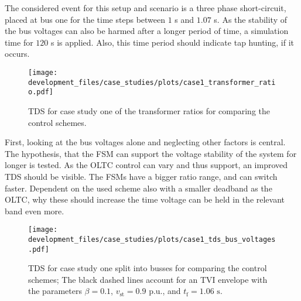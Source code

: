 The considered event for this setup and scenario is a three phase short-circuit, placed at bus one for the time steps between $1$ s and $1.07$ s.
As the stability of the bus voltages can also be harmed after a longer period of time, a simulation time for $120$ s is applied.
Also, this time period should indicate tap hunting, if it occurs.

\begin{figure}[htbp!]
    \centering
    \texttt{[image: development\_files/case\_studies/plots/case1\_transformer\_ratio.pdf]}
    \caption[\acs{TDS} for case study one of the transformer ratios for comparing the control schemes]{\acs{TDS} for case study one of the transformer ratios for comparing the control schemes.}
    \label{fig:case1-trans-ratio}
\end{figure}

First, looking at the bus voltages alone and neglecting other factors is central.
The hypothesis, that the \acs{FSM} can support the voltage stability of the system for longer is tested.
As the \acs{OLTC} control can vary and thus support, an improved \acs{TDS} should be visible. 
The \acsp{FSM} have a bigger ratio range, and can switch faster.
Dependent on the used scheme also with a smaller deadband as the \acs{OLTC}, why these should increase the time voltage can be held in the relevant band even more.  

\begin{figure}[htbp!]
    \centering
    \texttt{[image: development\_files/case\_studies/plots/case1\_tds\_bus\_voltages.pdf]}
    \caption[\acs{TDS} for case study one split into busses for comparing the control schemes]{\acs{TDS} for case study one split into busses for comparing the control schemes; The black dashed lines account for an \acs{TVI} envelope with the parameters $\beta=0.1$,  $v_\mathrm{st}=0.9\text{ p.u.}$, and $t_\mathrm{f}=1.06\text{ s}$.}
    \label{fig:case1-voltages}
\end{figure}

